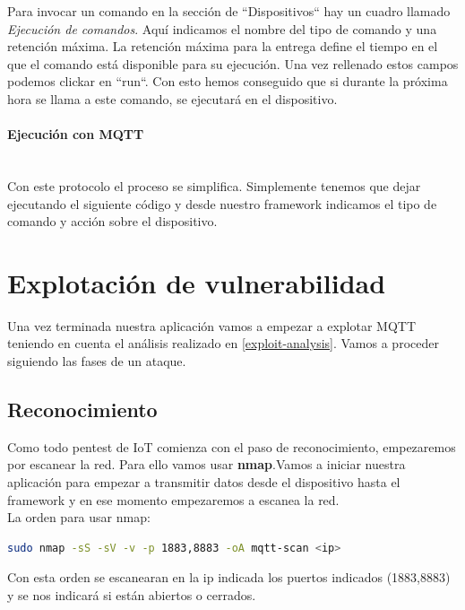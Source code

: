 Para invocar un comando en la sección de ``Dispositivos`` hay un cuadro llamado \textit{Ejecución de comandos}. Aquí indicamos el nombre del tipo de comando y una retención máxima. La retención máxima para la entrega define el tiempo en el que el comando está disponible para su ejecución. Una vez rellenado estos campos podemos clickar en ``run``. Con esto hemos conseguido que si durante la próxima hora se llama a este comando, se ejecutará en el dispositivo.

\paragraph{Ejecución con MQTT}  \hspace{0pt} \\

Con este protocolo el proceso se simplifica. Simplemente tenemos que dejar ejecutando el siguiente código y desde nuestro framework indicamos el tipo de comando y acción sobre el dispositivo.

\section{Explotación de vulnerabilidad}

Una vez terminada nuestra aplicación vamos a empezar a explotar MQTT teniendo en cuenta el análisis realizado en \ref{exploit-analysis}. Vamos a proceder siguiendo las fases de un ataque.

\subsection{Reconocimiento}

Como todo pentest de IoT comienza con el paso de reconocimiento, empezaremos por escanear la red. Para ello vamos usar \textbf{nmap}.Vamos a iniciar nuestra aplicación para empezar a transmitir datos desde el dispositivo hasta el framework y en ese momento empezaremos a escanea la red. \\

La orden para usar nmap:

\begin{lstlisting}[language=bash]
sudo nmap -sS -sV -v -p 1883,8883 -oA mqtt-scan <ip>
\end{lstlisting}

Con esta orden se escanearan en la ip indicada los puertos indicados (1883,8883) y se nos indicará si están abiertos o cerrados. \\

